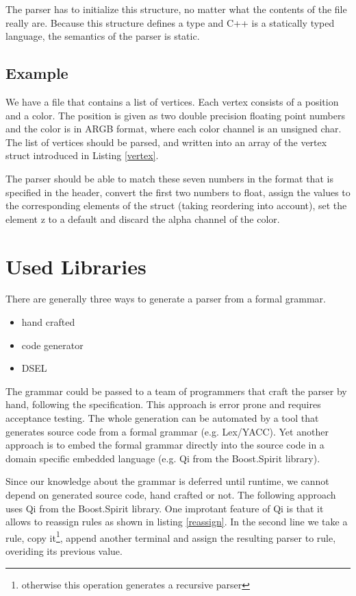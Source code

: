 \documentclass[a4paper,parskip=half,twocolumn]{scrartcl}
\begin{document}
The parser has to initialize this structure, no matter what the contents of the
file really are. Because this structure defines a type and C++ is a statically
typed language, the semantics of the parser is static.

\subsection{Example}
We have a file that contains a list of vertices. Each vertex consists of a
position and a color. The position is given as two double precision floating
point numbers and the color is in ARGB format, where each color channel is an
unsigned char. The list of vertices should be parsed, and written into an array
of the vertex struct introduced in Listing \ref{vertex}.

The parser should be able to match these seven numbers in the format that is
specified in the header, convert the first two numbers to float, assign the
values to the corresponding elements of the struct (taking reordering into
account), set the element z to a default and discard the alpha channel of the
color.

\section{Used Libraries}
There are generally three ways to generate a parser from a formal grammar.
\begin{itemize}
  \item hand crafted
  \item code generator
  \item DSEL
\end{itemize}
The grammar could be passed to a team of programmers that craft the parser by
hand, following the specification. This approach is error prone and requires
acceptance testing. The whole generation can be automated by a tool that
generates source code from a formal grammar (e.g. Lex/YACC). Yet another
approach is to embed the formal grammar directly into the source code in a
domain specific embedded language (e.g. Qi from the Boost.Spirit library).

Since our knowledge about the grammar is deferred until runtime, we cannot
depend on generated source code, hand crafted or not. The following approach
uses Qi from the Boost.Spirit library. One improtant feature of Qi is that it
allows to reassign rules as shown in listing \ref{reassign}. In the second line
we take a rule, copy it\footnote{otherwise this operation generates a recursive
parser}, append another terminal and assign the resulting parser to rule,
overiding its previous value. 
\end{document}
